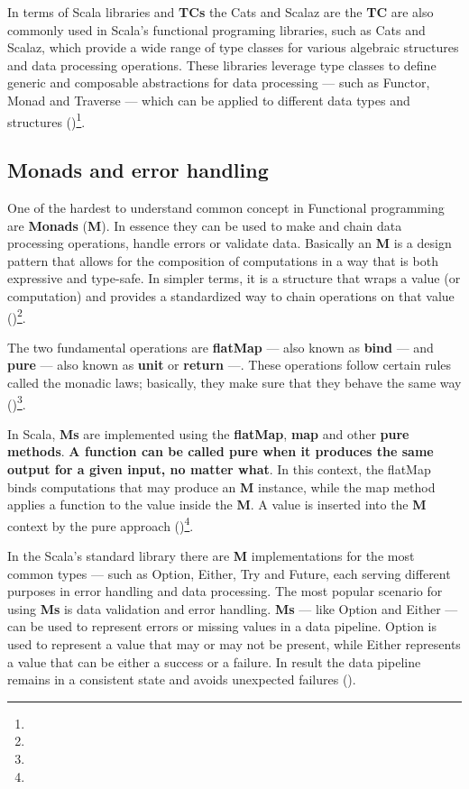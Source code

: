 

In terms of Scala libraries and \textbf{TCs} the Cats and Scalaz are the \textbf{TC} are also commonly used in Scala's functional programing libraries, such as Cats and Scalaz, which provide a wide range of type classes for various algebraic structures and data processing operations. These libraries leverage type classes to define generic and composable abstractions for data processing — such as Functor, Monad and Traverse — which can be applied to different data types and structures (\cite{odersky.etal_2021})\footnote[2]{}.

\subsection{Monads and error handling}

One of the hardest to understand common concept in Functional programming are \textbf{Monads} (\textbf{M}). In essence they can be used to make and chain data processing operations, handle errors or validate data. Basically an \textbf{M} is a design pattern that allows for the composition of computations in a way that is both expressive and type-safe. In simpler terms, it is a structure that wraps a value (or computation) and provides a standardized way to chain operations on that value
 (\cite{wadler1992monads})\footnote[15]{}.

The two fundamental operations are \textbf{flatMap} — also known as \textbf{bind} — and \textbf{pure} — also known as \textbf{unit} or \textbf{return} —. These operations follow certain rules called the monadic laws; basically, they make sure that they behave the same way (\cite{wadler1992monads})\footnote[15]{}.

In Scala, \textbf{Ms} are implemented using the \textbf{flatMap}, \textbf{map} and other \textbf{pure methods}. \textbf{A function can be called pure when it produces the same output for a given input, no matter what}. In this context, the flatMap binds computations that may produce an \textbf{M} instance, while the map method applies a function to the value inside the \textbf{M}. A value is inserted into the \textbf{M} context by the pure approach (\cite{joshuad.suerethScalaDepth2012})\footnote[4]{}.

In the Scala's standard library there are \textbf{M} implementations for the most common types — such as Option, Either, Try and Future, each serving different purposes in error handling and data processing. The most popular scenario for using \textbf{Ms} is data validation and error handling. \textbf{Ms} — like Option and Either — can be used to represent errors or missing values in a data pipeline. Option is used to represent a value that may or may not be present, while Either represents a value that can be either a success or a failure. In result the data pipeline remains in a consistent state and avoids unexpected failures (\cite{joshuad.suerethScalaDepth2012})\footnotemark[4].

